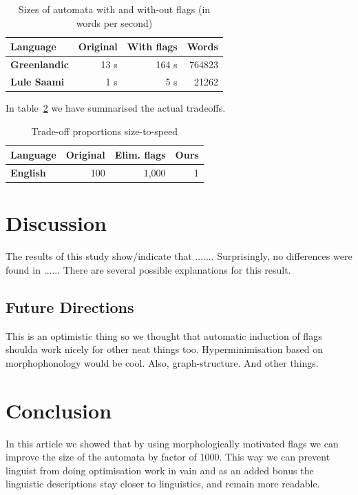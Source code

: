 \documentclass[11pt]{article}
\begin{document}
\begin{table}
    \centering
    \begin{tabular}{|l|r|r|r|}
        \hline
        \bf Language & \bf Original & \bf With flags & \bf Words \\
        \hline
        \bf Greenlandic & 13 s & 164 s  & 764823  \\
        \bf Lule Saami & 1 s & 5 s  & 21262  \\
        \hline
    \end{tabular}
    \caption{Sizes of automata with and with-out flags (in words per second)
    \label{table:speed}}
\end{table}

In table~\ref{table:tradeoff} we have summarised the actual tradeoffs.

\begin{table}
    \centering
    \begin{tabular}{|l|r|r|r|}
        \hline
        \bf Language & \bf Original & \bf Elim. flags & \bf Ours \\
        \hline
        \bf English & 100 & 1,000 & 1  \\
        \hline
    \end{tabular}
    \caption{Trade-off proportions size-to-speed
    \label{table:tradeoff}}
\end{table}


\section{Discussion}
\label{sec:discussion}

The results of this study show/indicate that .......
Surprisingly, no differences were found in ......
There are several possible explanations for this result.

\subsection{Future Directions}
\label{subsec:future-directions}

This is an optimistic thing so we thought that automatic induction of flags
shoulda work nicely for other neat things too. Hyperminimisation based on
morphophonology would be cool. Also, graph-structure. And other things.

\section{Conclusion}
\label{sec:conclusion}

In this article we showed that by using morphologically motivated flags we can
improve the size of the automata by factor of 1000. This way we can prevent
linguist from doing optimisation work in vain and as an added bonus the
linguistic descriptions stay closer to linguistics, and remain more readable.

\end{document}
